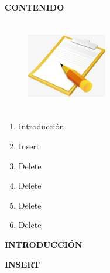\documentclass[11pt]{beamer}
\begin{document}
\begin{frame} {\bf \large {}}
\tableofcontents
{\center \bf \Large CONTENIDO \\}

\begin{figure}[right]
  \includegraphics[width=3.5cm, height=4cm]{Img/Indice.jpg}
\end{figure}

\begin{enumerate}
\item Introducci\'on
\item Insert
\item Delete
\item Delete
\item Delete
\item Delete
\end{enumerate}

\end{frame}

\begin{frame}{\bf \large {}}

{\center \bf \large INTRODUCCI\'ON \\}

\end{frame}

\begin{frame}{\bf \large {}}

{\center \bf \large INSERT \\}

\end{frame}
\end{document}

